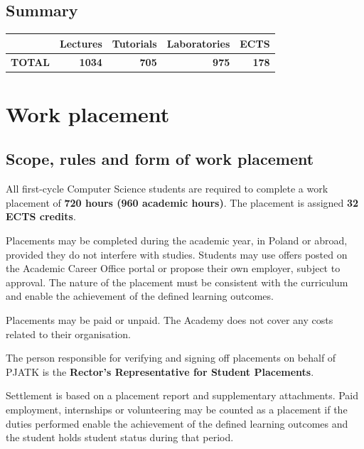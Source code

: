 \documentclass[12pt,a4paper]{article}
\begin{document}
\subsection*{Summary}

\begin{tabular}{lrrrr}
\toprule
\rowcolor{pjatkRed} {\color{white}} & {\color{white}\textbf{Lectures}} & {\color{white}\textbf{Tutorials}} & {\color{white}\textbf{Laboratories}} & {\color{white}\textbf{ECTS}} \\
\midrule
\textbf{TOTAL} & \textbf{1034} & \textbf{705} & \textbf{975} & \textbf{178} \\
\bottomrule
\end{tabular}



\newpage

\section{Work placement}

\subsection*{Scope, rules and form of work placement}

All first-cycle Computer Science students are required to complete a work placement of \textbf{720 hours (960 academic hours)}. The placement is assigned \textbf{32 ECTS credits}.

Placements may be completed during the academic year, in Poland or abroad, provided they do not interfere with studies. Students may use offers posted on the Academic Career Office portal or propose their own employer, subject to approval. The nature of the placement must be consistent with the curriculum and enable the achievement of the defined learning outcomes.

Placements may be paid or unpaid. The Academy does not cover any costs related to their organisation.

The person responsible for verifying and signing off placements on behalf of PJATK is the \textbf{Rector's Representative for Student Placements}.

Settlement is based on a placement report and supplementary attachments. Paid employment, internships or volunteering may be counted as a placement if the duties performed enable the achievement of the defined learning outcomes and the student holds student status during that period.
\end{document}
